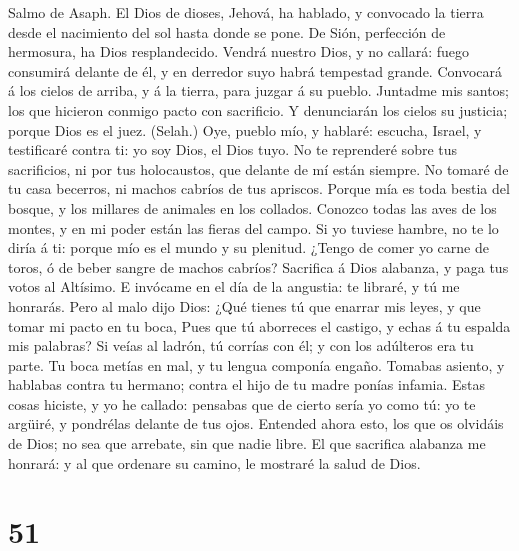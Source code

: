  Salmo de Asaph. El Dios de dioses, Jehová, ha hablado, y
convocado la tierra desde el nacimiento del sol hasta donde se pone.
 De Sión, perfección de hermosura, ha Dios resplandecido.
 Vendrá nuestro Dios, y no callará: fuego consumirá
delante de él, y en derredor suyo habrá tempestad grande. 
Convocará á los cielos de arriba, y á la tierra, para juzgar á su
pueblo.  Juntadme mis santos; los que hicieron conmigo
pacto con sacrificio.  Y denunciarán los cielos su
justicia; porque Dios es el juez. (Selah.)  Oye, pueblo
mío, y hablaré: escucha, Israel, y testificaré contra ti: yo soy Dios,
el Dios tuyo.  No te reprenderé sobre tus sacrificios, ni
por tus holocaustos, que delante de mí están siempre.  No
tomaré de tu casa becerros, ni machos cabríos de tus apriscos.
 Porque mía es toda bestia del bosque, y los millares de
animales en los collados.  Conozco todas las aves de los
montes, y en mi poder están las fieras del campo.  Si yo
tuviese hambre, no te lo diría á ti: porque mío es el mundo y su
plenitud.  ¿Tengo de comer yo carne de toros, ó de beber
sangre de machos cabríos?  Sacrifica á Dios alabanza, y
paga tus votos al Altísimo.  E invócame en el día de la
angustia: te libraré, y tú me honrarás.  Pero al malo
dijo Dios: ¿Qué tienes tú que enarrar mis leyes, y que tomar mi pacto en
tu boca,  Pues que tú aborreces el castigo, y echas á tu
espalda mis palabras?  Si veías al ladrón, tú corrías con
él; y con los adúlteros era tu parte.  Tu boca metías en
mal, y tu lengua componía engaño.  Tomabas asiento, y
hablabas contra tu hermano; contra el hijo de tu madre ponías infamia.
 Estas cosas hiciste, y yo he callado: pensabas que de
cierto sería yo como tú: yo te argüiré, y pondrélas delante de tus ojos.
 Entended ahora esto, los que os olvidáis de Dios; no sea
que arrebate, sin que nadie libre.  El que sacrifica
alabanza me honrará: y al que ordenare su camino, le mostraré la salud
de Dios.

\hypertarget{section-50}{%
\section{51}\label{section-50}}

